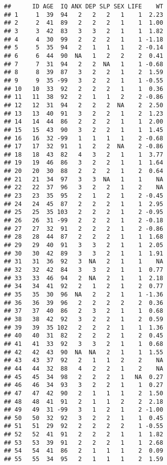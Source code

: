 \documentclass[]{book}
\theoremstyle{definition}
\theoremstyle{definition}
\theoremstyle{definition}
\theoremstyle{remark}
\begin{document}
\begin{verbatim}
##      ID AGE  IQ ANX DEP SLP SEX LIFE    WT
## 1     1  39  94   2   2   2   1    1  2.23
## 2     2  41  89   2   2   2   1    1  1.00
## 3     3  42  83   3   3   2   1    1  1.82
## 4     4  30  99   2   2   2   1    1 -1.18
## 5     5  35  94   2   1   1   1    2 -0.14
## 6     6  44  90  NA   1   2   2    2  0.41
## 7     7  31  94   2   2  NA   1    1 -0.68
## 8     8  39  87   3   2   2   1    2  1.59
## 9     9  35 -99   3   2   2   1    1 -0.55
## 10   10  33  92   2   2   2   1    1  0.36
## 11   11  38  92   2   1   1   2    2 -0.86
## 12   12  31  94   2   2   2  NA    2  2.50
## 13   13  40  91   3   2   2   1    2  1.23
## 14   14  44  86   2   2   2   1    1  2.00
## 15   15  43  90   3   2   2   1    1  1.45
## 16   16  32 -99   1   1   1   1    2 -0.68
## 17   17  32  91   1   2   2  NA    2 -0.86
## 18   18  43  82   4   3   2   1    1  3.77
## 19   19  46  86   3   2   2   1    1  1.64
## 20   20  30  88   2   2   2   1    2  0.64
## 21   21  34  97   3   3  NA   1    1    NA
## 22   22  37  96   3   2   2   1    2    NA
## 23   23  35  95   2   1   2   1    2 -0.45
## 24   24  45  87   2   2   2   1    1  2.95
## 25   25  35 103   2   2   2   1    2 -0.95
## 26   26  31 -99   2   2   2   1    2 -0.18
## 27   27  32  91   2   2   2   1    2 -0.86
## 28   28  44  87   2   2   2   1    1  1.68
## 29   29  40  91   3   3   2   1    1  2.05
## 30   30  42  89   3   3   2   1    1  1.91
## 31   31  36  92   3  NA   2   1    1    NA
## 32   32  42  84   3   3   2   1    1  0.77
## 33   33  46  94   2  NA   2   1    1  2.18
## 34   34  41  92   2   1   2   1    2  0.77
## 35   35  30  96  NA   2   2   1    1 -1.36
## 36   36  39  96   2   2   2   2    2  0.36
## 37   37  40  86   2   3   2   1    1  0.68
## 38   38  42  92   3   2   2   1    2  0.59
## 39   39  35 102   2   2   2   1    1  1.36
## 40   40  31  82   2   2   2   1    2  0.45
## 41   41  33  92   3   3   2   1    1  0.68
## 42   42  43  90  NA  NA   2   1    1  1.55
## 43   43  37  92   2   1   1   2    2    NA
## 44   44  32  88   4   2   2   1    2    NA
## 45   45  34  98   2   2   2   1   NA  0.27
## 46   46  34  93   3   2   2   1    1  0.27
## 47   47  42  90   2   1   1   1    2  1.50
## 48   48  41  91   2   1   1   2    2  2.18
## 49   49  31 -99   3   1   2   1    2 -1.00
## 50   50  32  92   3   2   2   1    1  0.45
## 51   51  29  92   2   2   2   2    1 -0.55
## 52   52  41  91   2   2   2   1    1  1.82
## 53   53  39  91   2   2   2   1    1  2.68
## 54   54  41  86   2   1   1   1    2  0.09
## 55   55  34  95   2   1   1   1    2  1.59

\end{verbatim}
\end{document}

